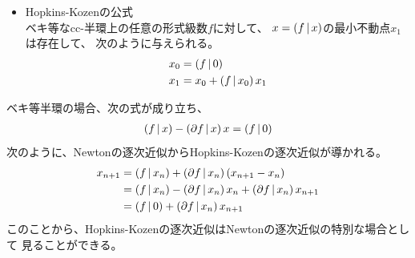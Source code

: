 {\begin{itemize}
		cc-半環上の任意の形式級数$f$に対して、
		$x=\plr{f\bou x}$の最小不動点$\lim_{n\to\infty}x_n$は存在する。
		\begin{equation*}\begin{split}
			x_0 &= 0 \\
			x_1 &= \plr{f\bou x_0} + \plr{\partial f\bou x_0}\plr{x_1 - x_0} \\
			\vdots \\
			x_{n+1} &= \plr{f\bou x_n} + \plr{\partial f\bou x_n}\plr{x_{n+1} - x_n} \\
		\end{split}\end{equation*}
		漸化式は次のように書き換えることができる。
		\begin{equation*}\begin{split}
			x_{n+1} = \frac{\plr{f\bou x_n} - \plr{\partial f\bou x_n}x_n}
			{1 - \plr{\partial f\bou x_n}}
			= x_n + \frac{\plr{f\bou x_n} - x_n}{1 - \plr{\partial f\bou x_n}}
		\end{split}\end{equation*}
		Newtonの逐次近似の場合、$\plr{\partial f\bou x_n} = 1$となる点$x_n$が
		あると、漸化式を進めることができなくなる。この時には、
		$\plr{f\bou x_n}=x_n$でない限り、漸化式が破綻する。
		また、実数の場合は、無限ループに入ることあるようだ。cc-半環でも
		無限ループに入ることがあるのだろうか？
		\item Hopkins-Kozenの公式 \\
		ベキ等なcc-半環上の任意の形式級数$f$に対して、
		$x=\plr{f\bou x}$の最小不動点$x_1$は存在して、
		次のように与えられる。
		\begin{equation*}\begin{split}
			x_0 &= \mathinner{({f{\,|\,}0})} \\
			x_1 &= x_0 + \mathinner{({f{\,|\,}x_0})}x_1
		\end{split}\end{equation*}
	\end{itemize} %

	ベキ等半環の場合、次の式が成り立ち、
	\begin{equation*}\begin{split}
		\mathinner{({f{\,|\,}x})} - \mathinner{({\partial f{\,|\,}x})}x = \mathinner{({f{\,|\,}0})}
	\end{split}\end{equation*}
	次のように、Newtonの逐次近似からHopkins-Kozenの逐次近似が導かれる。
	\begin{equation*}\begin{split}
			x_{n+1} 
			&= \mathinner{({f{\,|\,}x_n})} + \mathinner{({\partial f{\,|\,}x_n})}\mathinner{({x_{n+1} - x_n})} \\
			&= \mathinner{({f{\,|\,}x_n})} - \mathinner{({\partial f{\,|\,}x_n})}x_n
				+ \mathinner{({\partial f{\,|\,}x_n})}x_{n+1} \\
			&= \mathinner{({f{\,|\,}0})} + \mathinner{({\partial f{\,|\,}x_n})}x_{n+1} \\
	\end{split}\end{equation*}
	このことから、Hopkins-Kozenの逐次近似はNewtonの逐次近似の特別な場合として
	見ることができる。

}

